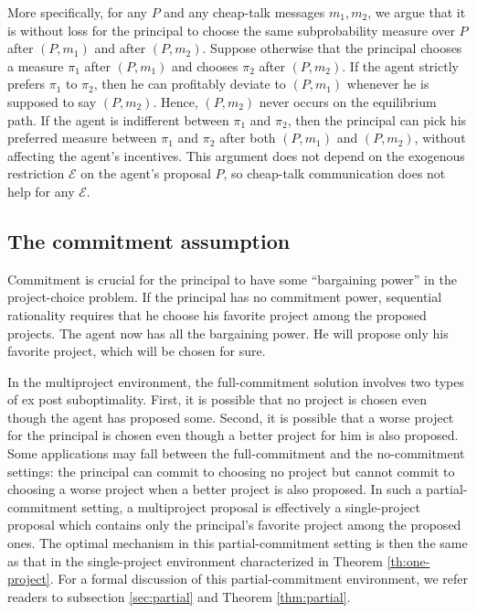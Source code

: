 \documentclass[12pt,english]{article}
\newcommand{\cale}{\mathcal E}
\theoremstyle{remark}
\theoremstyle{plain}
\theoremstyle{definition}
\begin{document}
More specifically, for any $P$ and any cheap-talk messages $m_1,m_2$, we argue that it is without loss for the principal to choose the same subprobability measure over $P$ after $(P,m_1)$ and after $(P,m_2)$. Suppose otherwise that the principal chooses a measure $\pi_1 $ after $(P,m_1)$ and chooses $\pi_2 $ after $(P,m_2)$. If the agent strictly prefers $\pi_1$ to $\pi_2$, then he can profitably deviate to $(P,m_1)$ whenever he is supposed to say $(P,m_2)$. Hence, $(P,m_2)$ never occurs on the equilibrium path. If the agent is indifferent between $\pi_1$ and $\pi_2$, then the principal can pick his preferred measure between $\pi_1$ and $\pi_2$ after both $(P,m_1)$ and $(P,m_2)$, without affecting the agent's incentives. This argument does not depend on the exogenous restriction $\cale$ on the agent's proposal $P$, so cheap-talk communication does not help for any $\cale$.

\subsection{The commitment assumption}

Commitment is crucial for the principal to have some ``bargaining power'' in the project-choice problem. If the principal has no commitment power, sequential rationality requires that he choose his favorite project among the proposed projects. The agent now has all the bargaining power. He will propose only his favorite project, which will be chosen for sure.

In the multiproject environment, the full-commitment solution involves two types of ex post suboptimality. First, it is possible that no project is chosen even though the agent has proposed some. Second, it is possible that a worse project for the principal is chosen even though a better project for him is also proposed. Some applications may fall between the full-commitment and the no-commitment settings: the principal can commit to choosing no project but cannot commit to choosing a worse project when a better project is also proposed. In such a partial-commitment setting, a multiproject proposal is effectively a single-project proposal which contains only the principal's favorite project among the proposed ones. The optimal mechanism in this partial-commitment setting is then the same as that in the single-project environment characterized in Theorem \ref{th:one-project}. For a formal discussion of this partial-commitment environment, we refer readers to subsection \ref{sec:partial} and Theorem \ref{thm:partial}. 
\end{document}
